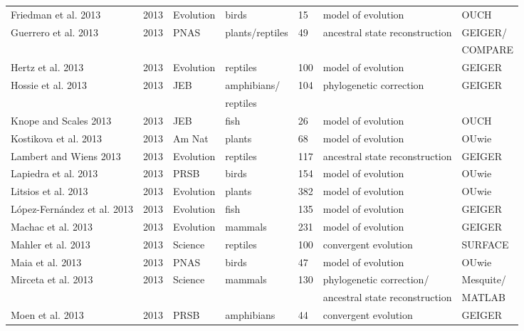 \begin{landscape}
\begin{center}
\begin{longtable}{p{6cm}llllll}
Friedman et al. 2013  &   2013    &   Evolution   &   birds   &   15  &   model of evolution  &   OUCH    \\
Guerrero et al. 2013  &   2013    &   PNAS    &   plants/reptiles &   49  &   ancestral state reconstruction  &   GEIGER/ \\
    &       &       &       &       &       &   COMPARE \\
Hertz et al. 2013 &   2013    &   Evolution   &   reptiles    &   100 &   model of evolution  &   GEIGER  \\
Hossie et al. 2013    &   2013    &   JEB &   amphibians/ &   104 &   phylogenetic correction &   GEIGER  \\
    &       &       &   reptiles    &       &       &       \\
Knope and Scales 2013 &   2013    &   JEB &   fish    &   26  &   model of evolution  &   OUCH    \\
Kostikova et al. 2013 &   2013    &   Am Nat  &   plants  &   68  &   model of evolution  &   OUwie   \\
Lambert and Wiens 2013    &   2013    &   Evolution   &   reptiles    &   117 &   ancestral state reconstruction  &   GEIGER  \\
Lapiedra et al. 2013  &   2013    &   PRSB    &   birds   &   154 &   model of evolution  &   OUwie   \\
Litsios et al. 2013   &   2013    &   Evolution   &   plants  &   382 &   model of evolution  &   OUwie   \\
L\'{o}pez-Fern\'{a}ndez et al. 2013   &   2013    &   Evolution   &   fish    &   135 &   model of evolution  &   GEIGER  \\
Machac et al. 2013    &   2013    &   Evolution   &   mammals &   231 &   model of evolution  &   GEIGER  \\
Mahler et al. 2013    &   2013    &   Science &   reptiles    &   100 &   convergent evolution    &   SURFACE \\
Maia et al. 2013  &   2013    &   PNAS    &   birds   &   47  &   model of evolution  &   OUwie   \\
Mirceta et al. 2013   &   2013    &   Science &   mammals &   130 &   phylogenetic correction/    &   Mesquite/   \\
    &       &       &       &       &   ancestral state reconstruction  &   MATLAB  \\
Moen et al. 2013  &   2013    &   PRSB    &   amphibians  &   44  &   convergent evolution    &   GEIGER  \\

\end{longtable}
\end{center}
\end{landscape}
